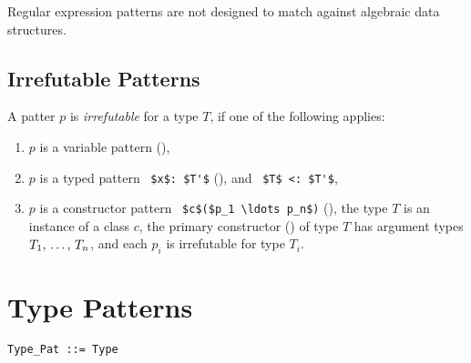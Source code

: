 Regular expression patterns are not designed to match against algebraic data structures. 

\subsection{Irrefutable Patterns}
\label{sec:irrefutable-patterns}

A patter $p$ is {\em irrefutable} for a type $T$, if one of the following applies: 
\begin{enumerate}
\item $p$ is a variable pattern (),
\item $p$ is a typed pattern ~\lstinline!$x$: $T'$! (), and ~\lstinline!$T$ <: $T'$!,
\item $p$ is a constructor pattern ~\lstinline!$c$($p_1 \ldots p_n$)! (), the type $T$ is an instance of a class $c$, the primary constructor () of type $T$ has argument types $T_1 ,\, \ldots ,\, T_n$, and each $p_i$ is irrefutable for type $T_i$. 
\end{enumerate}






\section{Type Patterns}
\label{sec:type-patterns}

\syntax\begin{lstlisting}
Type_Pat ::= Type
\end{lstlisting}

